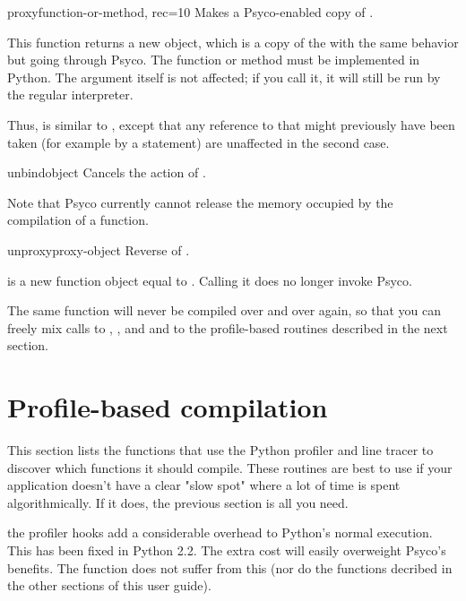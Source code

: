 \documentclass{manual}
\begin{document}
\begin{funcdesc}{proxy}{function-or-method, rec=10}
  Makes a Psyco-enabled copy of .

  This function returns a new object, which is a copy of the  with the same behavior but going through Psyco.  The function or method must be implemented in Python.  The argument itself is not affected; if you call it, it will still be run by the regular interpreter.

  Thus,  is similar to , except that any reference to  that might previously have been taken (for example by a  statement) are unaffected in the second case.
\end{funcdesc}

\begin{funcdesc}{unbind}{object}
  Cancels the action of .

  Note that Psyco currently cannot release the memory occupied by the compilation of a function.
\end{funcdesc}

\begin{funcdesc}{unproxy}{proxy-object}
  Reverse of .

   is a new function object equal to .  Calling it does no longer invoke Psyco.
\end{funcdesc}

The same function will never be compiled over and over again, so that you can freely mix calls to , ,  and  and to the profile-based routines described in the next section.


\section{Profile-based compilation}

This section lists the functions that use the Python profiler and line tracer to discover which functions it should compile.  These routines are best to use if your application doesn't have a clear "slow spot" where a lot of time is spent algorithmically.  If it does, the previous section is all you need.

 the profiler hooks add a considerable overhead to Python's normal execution.  This has been fixed in Python 2.2.  The extra cost will easily overweight Psyco's benefits.  The function  does not suffer from this (nor do the functions decribed in the other sections of this user guide).
\end{document}
